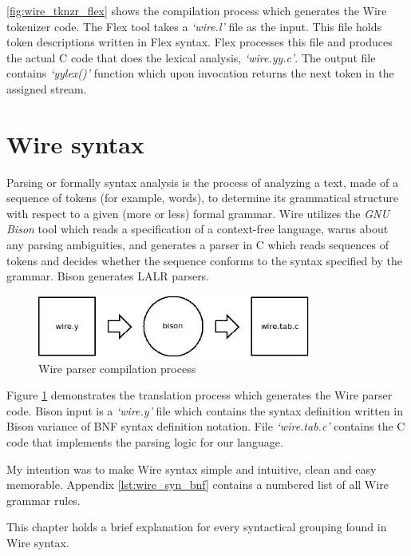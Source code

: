 \documentclass[times, utf8, diplomski]{fer}
\begin{document}
\ref{fig:wire_tknzr_flex} shows the compilation process which generates the Wire 
tokenizer code. The Flex tool takes a \emph{`wire.l'} file as the input. 
This file holds token descriptions written in Flex syntax. Flex processes this 
file and produces the actual C code that does the lexical analysis, \emph{`wire.yy.c'}.
The output file contains \emph{`yylex()'} function which upon invocation returns 
the next token in the assigned stream.

\section{Wire syntax}
Parsing or formally syntax analysis is  the process of analyzing a text, made of 
a sequence of tokens (for example, words), to determine its grammatical structure 
with respect to a given (more or less) formal grammar. Wire utilizes the 
\emph{GNU Bison} tool which reads a specification of a context-free language, 
warns about any parsing ambiguities, and generates a parser in C which reads 
sequences of tokens and decides whether the sequence conforms to the syntax 
specified by the grammar. Bison generates LALR parsers.

\begin{figure}[htb]
\begin{center}
\leavevmode
\includegraphics[width=0.8\textwidth]{bison}
\end{center}
\caption{Wire parser compilation process}
\label{fig:wire_prsr_bison}
\end{figure}

Figure \ref{fig:wire_prsr_bison} demonstrates the translation process which 
generates the Wire parser code. Bison input is a \emph{`wire.y'} file which 
contains the syntax definition written in Bison variance of BNF syntax definition 
notation. File \emph{`wire.tab.c'} contains the C code that implements the parsing 
logic for our language.

My intention was to make Wire syntax simple and intuitive, clean and easy memorable. 
Appendix \ref{lst:wire_syn_bnf} contains a numbered list of all Wire grammar rules. 

This chapter holds a brief explanation for every syntactical grouping found in Wire syntax.
\end{document}
